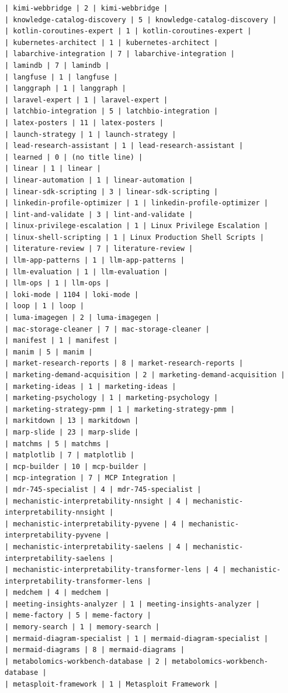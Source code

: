 \begin{Verbatim}[breaklines,breakanywhere,fontsize=\footnotesize]
| kimi-webbridge | 2 | kimi-webbridge |
| knowledge-catalog-discovery | 5 | knowledge-catalog-discovery |
| kotlin-coroutines-expert | 1 | kotlin-coroutines-expert |
| kubernetes-architect | 1 | kubernetes-architect |
| labarchive-integration | 7 | labarchive-integration |
| lamindb | 7 | lamindb |
| langfuse | 1 | langfuse |
| langgraph | 1 | langgraph |
| laravel-expert | 1 | laravel-expert |
| latchbio-integration | 5 | latchbio-integration |
| latex-posters | 11 | latex-posters |
| launch-strategy | 1 | launch-strategy |
| lead-research-assistant | 1 | lead-research-assistant |
| learned | 0 | (no title line) |
| linear | 1 | linear |
| linear-automation | 1 | linear-automation |
| linear-sdk-scripting | 3 | linear-sdk-scripting |
| linkedin-profile-optimizer | 1 | linkedin-profile-optimizer |
| lint-and-validate | 3 | lint-and-validate |
| linux-privilege-escalation | 1 | Linux Privilege Escalation |
| linux-shell-scripting | 1 | Linux Production Shell Scripts |
| literature-review | 7 | literature-review |
| llm-app-patterns | 1 | llm-app-patterns |
| llm-evaluation | 1 | llm-evaluation |
| llm-ops | 1 | llm-ops |
| loki-mode | 1104 | loki-mode |
| loop | 1 | loop |
| luma-imagegen | 2 | luma-imagegen |
| mac-storage-cleaner | 7 | mac-storage-cleaner |
| manifest | 1 | manifest |
| manim | 5 | manim |
| market-research-reports | 8 | market-research-reports |
| marketing-demand-acquisition | 2 | marketing-demand-acquisition |
| marketing-ideas | 1 | marketing-ideas |
| marketing-psychology | 1 | marketing-psychology |
| marketing-strategy-pmm | 1 | marketing-strategy-pmm |
| markitdown | 13 | markitdown |
| marp-slide | 23 | marp-slide |
| matchms | 5 | matchms |
| matplotlib | 7 | matplotlib |
| mcp-builder | 10 | mcp-builder |
| mcp-integration | 7 | MCP Integration |
| mdr-745-specialist | 4 | mdr-745-specialist |
| mechanistic-interpretability-nnsight | 4 | mechanistic-interpretability-nnsight |
| mechanistic-interpretability-pyvene | 4 | mechanistic-interpretability-pyvene |
| mechanistic-interpretability-saelens | 4 | mechanistic-interpretability-saelens |
| mechanistic-interpretability-transformer-lens | 4 | mechanistic-interpretability-transformer-lens |
| medchem | 4 | medchem |
| meeting-insights-analyzer | 1 | meeting-insights-analyzer |
| meme-factory | 5 | meme-factory |
| memory-search | 1 | memory-search |
| mermaid-diagram-specialist | 1 | mermaid-diagram-specialist |
| mermaid-diagrams | 8 | mermaid-diagrams |
| metabolomics-workbench-database | 2 | metabolomics-workbench-database |
| metasploit-framework | 1 | Metasploit Framework |

\end{Verbatim}
